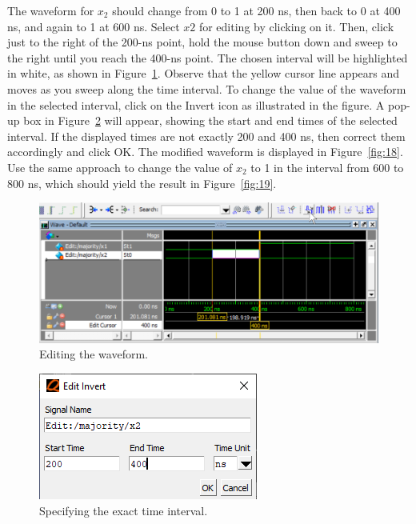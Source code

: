 \documentclass[11pt, twoside, pdftex]{article}
\begin{document}
The waveform for $x_2$ should change from 0 to 1 at 200 ns, then back to 0 at 400 ns, 
and again to 1 at 600 ns. Select $x2$ for editing by clicking on it. Then, click just to the 
right of the 200-ns point, hold the mouse button down and sweep to the right until 
you reach the 400-ns point. The chosen interval will be highlighted in white, as shown in 
Figure~\ref{fig:16}.  Observe that the yellow cursor line appears and moves as you sweep
along the time interval.  To change the value of the waveform in the selected interval, click on the 
{\sf Invert} icon as illustrated in the figure. A pop-up box in Figure~\ref{fig:17} will 
appear, showing the start and end times of the selected interval. If the displayed times are 
not exactly 200 and 400 ns, then correct them accordingly and click {\sf OK}. The modified 
waveform is displayed in Figure~\ref{fig:18}.  Use the same approach to change the value 
of $x_2$ to 1 in the interval from 600 to 800 ns, which should yield the result in 
Figure~\ref{fig:19}.

\begin{figure}[H]
   \begin{center}
      \includegraphics[scale=1.0]{figures/figure16.png}
   \caption{Editing the waveform.} 
	 \label{fig:16}
	 \end{center}
\end{figure}

\begin{figure}[H]
   \begin{center}
      \includegraphics[scale=0.75]{figures/figure17.png}
   \caption{Specifying the exact time interval.} 
	 \label{fig:17}
	 \end{center}
\end{figure}
\end{document}
